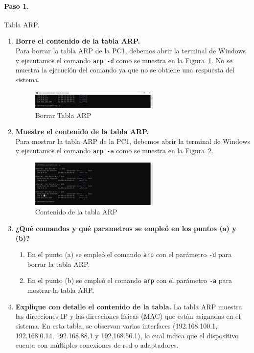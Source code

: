         \paragraph{Paso 1.}
        Tabla ARP.
        \begin{enumerate}
            \item \textbf{Borre el contenido de la tabla ARP.}\\
            Para borrar la tabla ARP de la PC1, debemos abrir la terminal de Windows y ejecutamos el comando \texttt{arp -d} como se muestra en la Figura~\ref{fig:borrar_arp}. No se muestra la ejecución del comando ya que no se obtiene una respuesta del sistema.
            \begin{figure}[H]
                \centering
                \includegraphics[width=0.6\textwidth]{img/borrar_tabla_ARP.PNG}
                \caption{Borrar Tabla ARP}
                \label{fig:borrar_arp}
            \end{figure}
            \item \textbf{Muestre el contenido de la tabla ARP.}\\
            Para mostrar la tabla ARP de la PC1, debemos abrir la terminal de Windows y ejecutamos el comando \texttt{arp -a} como se muestra en la Figura~\ref{fig:tabla_arp}.
            \begin{figure}[H]
                \centering
                \includegraphics[width=0.6\textwidth]{img/tabla_ARP.PNG}
                \caption{Contenido de la tabla ARP}
                \label{fig:tabla_arp}
            \end{figure}
            \item \textbf{¿Qué comandos y qué parametros se empleó en los puntos (a) y (b)?}
            \begin{enumerate}
                \item En el punto (a) se empleó el comando \texttt{arp} con el parámetro \texttt{-d} para borrar la tabla ARP. 
                \item En el punto (b) se empleó el comando \texttt{arp} con el parámetro \texttt{-a} para mostrar la tabla ARP.
            \end{enumerate}
            \item \textbf{Explique con detalle el contenido de la tabla.}
            La tabla ARP muestra las direcciones IP y las direcciones físicas (MAC) que están asignadas en el sistema. En esta tabla, se observan varias interfaces (192.168.100.1, 192.168.0.14, 192.168.88.1 y 192.168.56.1), lo cual indica que el dispositivo cuenta con múltiples conexiones de red o adaptadores.
            

\end{enumerate}
